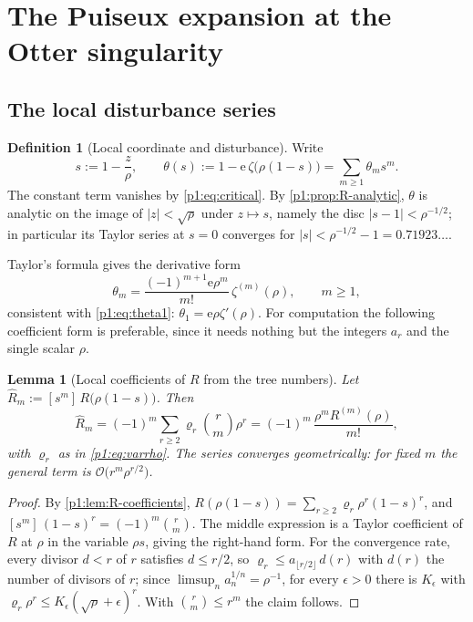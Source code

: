 \documentclass[11pt,a4paper,oneside]{book}
\theoremstyle{plain}
\newtheorem{lemma}[theorem]{Lemma}
\theoremstyle{definition}
\newtheorem{definition}[theorem]{Definition}
\theoremstyle{remark}
\newcommand{\e}{\mathrm{e}}
\newcommand{\Coef}[1]{[#1]\,}
\newcommand{\bigO}{\mathcal{O}}
\begin{document}
\section{The Puiseux expansion at the Otter singularity}
\label{p1:sec:puiseux}

\subsection{The local disturbance series}

\begin{definition}[Local coordinate and disturbance]
\label{p1:def:local}
Write
\begin{equation}
 s:=1-\frac{z}{\rho},
 \qquad
 \theta(s):=1-\e\,\zeta\bigl(\rho(1-s)\bigr)=\sum_{m\ge1}\theta_ms^{m}.
 \label{p1:eq:theta-def}
\end{equation}
The constant term vanishes by \cref{p1:eq:critical}.  By \cref{p1:prop:R-analytic}, $\theta$
is analytic on the image of $|z|<\sqrt\rho$ under $z\mapsto s$, namely the disc
$|s-1|<\rho^{-1/2}$; in particular its Taylor series at $s=0$ converges for
$|s|<\rho^{-1/2}-1=0.71923\ldots$.
\end{definition}

Taylor's formula gives the derivative form
\begin{equation}
 \theta_m=\frac{(-1)^{m+1}\e\rho^{m}}{m!}\,\zeta^{(m)}(\rho),
 \qquad m\ge1,
 \label{p1:eq:theta-derivative}
\end{equation}
consistent with \cref{p1:eq:theta1}: $\theta_1=\e\rho\zeta'(\rho)$.  For computation the
following coefficient form is preferable, since it needs nothing but the integers $a_r$ and
the single scalar $\rho$.

\begin{lemma}[Local coefficients of $R$ from the tree numbers]
\label{p1:lem:Rhat}
Let $\widehat R_m:=\Coef{s^{m}}R\bigl(\rho(1-s)\bigr)$.  Then
\begin{equation}
 \boxed{\;
 \widehat R_m=(-1)^{m}\sum_{r\ge2}\varrho_r\binom{r}{m}\rho^{r}
 =(-1)^{m}\,\frac{\rho^{m}R^{(m)}(\rho)}{m!},
 \;}
 \label{p1:eq:Rhat}
\end{equation}
with $\varrho_r$ as in \cref{p1:eq:varrho}.  The series converges geometrically: for fixed $m$
the general term is $\bigO\bigl(r^{m}\rho^{r/2}\bigr)$.
\end{lemma}

\begin{proof}
By \cref{p1:lem:R-coefficients}, $R(\rho(1-s))=\sum_{r\ge2}\varrho_r\rho^{r}(1-s)^{r}$, and
$\Coef{s^m}(1-s)^r=(-1)^m\binom rm$.  The middle expression is a Taylor coefficient of $R$ at
$\rho$ in the variable $\rho s$, giving the right-hand form.  For the convergence rate, every
divisor $d<r$ of $r$ satisfies $d\le r/2$, so $\varrho_r\le a_{\lfloor r/2\rfloor}\,d(r)$ with
$d(r)$ the number of divisors of $r$; since $\limsup_na_n^{1/n}=\rho^{-1}$, for every
$\epsilon>0$ there is $K_\epsilon$ with $\varrho_r\rho^{r}\le
K_\epsilon(\sqrt\rho+\epsilon)^{r}$.  With $\binom rm\le r^{m}$ the claim follows.
\end{proof}
\end{document}
